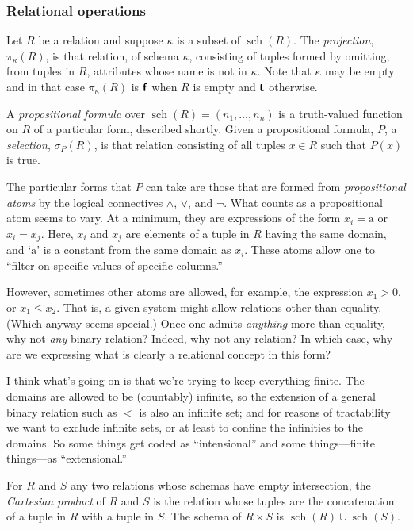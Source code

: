 \documentclass[10pt, a4paper, twocolumn]{article}
\newcommand{\dum}{\textbf{\textsf{f}}}
\newcommand{\dee}{\textbf{\textsf{t}}}
\DeclareMathOperator{\schema}{sch}
\begin{document}
\subsubsection{Relational operations}

Let $R$ be a relation and suppose $\kappa$ is a subset of $\schema(R)$. The
\emph{projection}, $\pi_\kappa(R)$, is that relation, of schema $\kappa$, consisting of
tuples formed by omitting, from tuples in $R$, attributes whose name is not in
$\kappa$. Note that $\kappa$ may be empty and in that case $\pi_\kappa(R)$ is $\dum$ when $R$ is
empty and $\dee$ otherwise.

A \emph{propositional formula} over $\schema(R) = (n_1, \dotsc, n_n)$ is a
truth-valued function on $R$ of a particular form, described shortly. Given a
propositional formula, $P$, a \emph{selection}, $\sigma_P(R)$, is that relation
consisting of all tuples $x\in R$ such that $P(x)$ is true.

The particular forms that $P$ can take are those that are formed from
\emph{propositional atoms} by the logical connectives $\wedge$, $\vee$, and $\neg$. What
counts as a propositional atom seems to vary. At a minimum, they are expressions
of the form $x_i = \mathrm{a}$ or $x_i = x_j$. Here, $x_i$ and $x_j$ are
elements of a tuple in $R$ having the same domain, and `$\mathrm{a}$' is a
constant from the same domain as $x_i$. These atoms allow one to ``filter on
specific values of specific columns.''

However, sometimes other atoms are allowed, for example, the expression $x_1 >
0$, or $x_1 \leq x_2$. That is, a given system might allow relations other than
equality. (Which anyway seems special.) Once one admits \emph{anything} more than
equality, why not \emph{any} binary relation? Indeed, why not any relation? In
which case, why are we expressing what is clearly a relational concept in this
form?

I think what's going on is that we're trying to keep everything finite. The
domains are allowed to be (countably) infinite, so the extension of a general
binary relation such as $<$ is also an infinite set; and for reasons of
tractability we want to exclude infinite sets, or at least to confine the
infinities to the domains. So some things get coded as ``intensional'' and some
things---finite things---as ``extensional.''

For $R$ and $S$ any two relations whose schemas have empty intersection, the
\emph{Cartesian product} of $R$ and $S$ is the relation whose tuples are the
concatenation of a tuple in $R$ with a tuple in $S$. The schema of $R\times S$ is
$\schema(R)\cup\schema(S)$.
\end{document}
